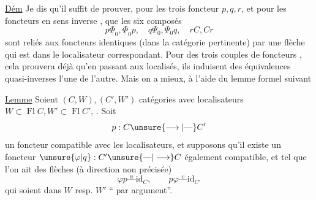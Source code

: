 
\uline{Dém} Je dis qu'il suffit de prouver, pour les trois foncteur $p,q,r$, et pour les foncteurs en sens inverse
, que les six composés
\[
p\underline{\Phi}_0,\underline{\Phi}_0p,\quad q\Psi_0,\Psi_0q,\quad rC,Cr
\]
sont reliés aux foncteurs identiques (dans la catégorie pertinente) par une flèche qui est dans le localisateur  correspondant. Pour  des trois couples de foncteurs , cela prouvera déjà qu'en passant aux localisés,  ils induisent des équivalences quasi-inverses l'une de l'autre. Mais on a mieux, à l'aide du lemme formel suivant

\uline{Lemme} Soient $(C,W),(C',W')$   catégories avec localisateurs $W\subset\operatorname{Fl}C,W'\subset\operatorname{Fl}C'$, . Soit
\[ p:C\unsure{\longrightarrow|\text{---}}C' \]
un foncteur compatible avec les localisateurs, et supposons qu'il existe un foncteur $\unsure{\varphi|q}:C'\unsure{\text{---}|\longrightarrow}C$ également compatible, et tel que  l'on ait des flèches (à direction non précisée)
\[ \varphi p\overset{u}{\text{---}}\mathrm{id}_C,\qquad p\varphi\overset{v}{\text{---}}\mathrm{id}_{C'} \]
qui soient dans $W$ resp. $W'$ `` par argument''.



